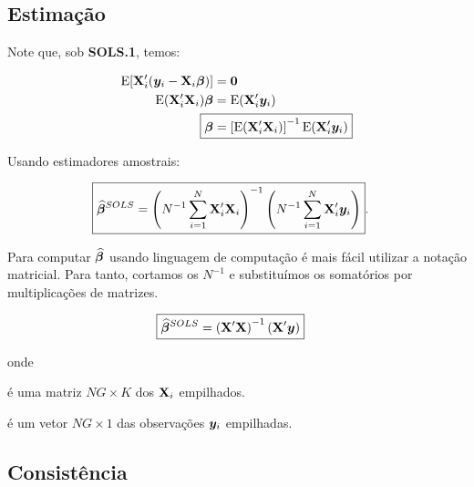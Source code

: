 \documentclass[11pt, oneside, a4paper, article]{article}
\numberwithin{equation}{section}
\begin{document}
\subsection{Estimação}
Note que, sob \textbf{SOLS.1}, temos:

\vspace{-1 em}
\begin{align} 
	\notag
	\E[ \Xmat_{i}' ( \yvec_{i} - \Xmat_{i} \betavec ) ] &= \zerovec
	\\
	\notag
	\E( \Xmat_{i}' \Xmat_{i} ) \betavec &= \E( \Xmat_{i}' \yvec_{i} )  
	\\
	\label{sols:beta}
	\Aboxed{
		\betavec &=
		\left[ \E( \Xmat_{i}' \Xmat_{i} )  \right]^{-1}
	\E( \Xmat_{i}' \yvec_{i} )  }
\end{align}

Usando estimadores amostrais:

\vspace{-1 em}
\begin{align} \label{sols:betahat}
	\Aboxed{
		\betahatbold^{SOLS} &=
		\left( N^{-1} \sum_{i=1}^{N} \Xmat_{i}' \Xmat_{i}   \right)^{-1}
		\left( N^{-1} \sum_{i=1}^{N} \Xmat_{i}' \yvec_{i}   \right)
	}.
\end{align}

Para computar $\widehat{\boldsymbol{\beta}}$ usando linguagem de computação é mais fácil utilizar a notação matricial.
Para tanto, cortamos os $N^{-1}$ e substituímos os somatórios por multiplicações de matrizes.

\vspace{-1 em}
\begin{align} 
	\label{sols:betahat:mat}
	\Aboxed{
		\betahatbold^{SOLS} &=
		\left(  \Xmat' \Xmat   \right)^{-1} \left(  \Xmat' \yvec   \right)
	}
\end{align}

\noindent
onde
\begin{description}[noitemsep]
	\item [$\Xmat \equiv (\Xmat_{1}', \dots, \Xmat_{N}')$]  é uma matriz $NG \times K$ dos $\mathbf{X}_{i}$ empilhados.

	\item [$\yvec \equiv (\yvec_{1}', \dots, \yvec_{N}')$] é um vetor $NG \times 1$ das observações $\boldsymbol{y}_{i}$ empilhadas.
\end{description}

\subsection{Consistência}
\end{document}
